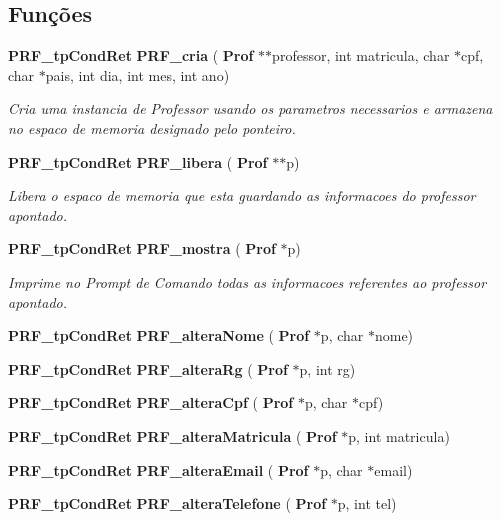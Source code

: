 \subsection*{Funções}
\begin{DoxyCompactItemize}
\item 
\textbf{ P\+R\+F\+\_\+tp\+Cond\+Ret} \textbf{ P\+R\+F\+\_\+cria} (\textbf{ Prof} $\ast$$\ast$professor, int matricula, char $\ast$cpf, char $\ast$pais, int dia, int mes, int ano)
\begin{DoxyCompactList}\small\item\em Cria uma instancia de Professor usando os parametros necessarios e armazena no espaco de memoria designado pelo ponteiro. \end{DoxyCompactList}\item 
\textbf{ P\+R\+F\+\_\+tp\+Cond\+Ret} \textbf{ P\+R\+F\+\_\+libera} (\textbf{ Prof} $\ast$$\ast$p)
\begin{DoxyCompactList}\small\item\em Libera o espaco de memoria que esta guardando as informacoes do professor apontado. \end{DoxyCompactList}\item 
\textbf{ P\+R\+F\+\_\+tp\+Cond\+Ret} \textbf{ P\+R\+F\+\_\+mostra} (\textbf{ Prof} $\ast$p)
\begin{DoxyCompactList}\small\item\em Imprime no Prompt de Comando todas as informacoes referentes ao professor apontado. \end{DoxyCompactList}\item 
\textbf{ P\+R\+F\+\_\+tp\+Cond\+Ret} {\bfseries P\+R\+F\+\_\+altera\+Nome} (\textbf{ Prof} $\ast$p, char $\ast$nome)
\item 
\textbf{ P\+R\+F\+\_\+tp\+Cond\+Ret} {\bfseries P\+R\+F\+\_\+altera\+Rg} (\textbf{ Prof} $\ast$p, int rg)
\item 
\textbf{ P\+R\+F\+\_\+tp\+Cond\+Ret} {\bfseries P\+R\+F\+\_\+altera\+Cpf} (\textbf{ Prof} $\ast$p, char $\ast$cpf)
\item 
\textbf{ P\+R\+F\+\_\+tp\+Cond\+Ret} {\bfseries P\+R\+F\+\_\+altera\+Matricula} (\textbf{ Prof} $\ast$p, int matricula)
\item 
\textbf{ P\+R\+F\+\_\+tp\+Cond\+Ret} {\bfseries P\+R\+F\+\_\+altera\+Email} (\textbf{ Prof} $\ast$p, char $\ast$email)
\item 
\textbf{ P\+R\+F\+\_\+tp\+Cond\+Ret} {\bfseries P\+R\+F\+\_\+altera\+Telefone} (\textbf{ Prof} $\ast$p, int tel)
\item 

\end{DoxyCompactItemize}
